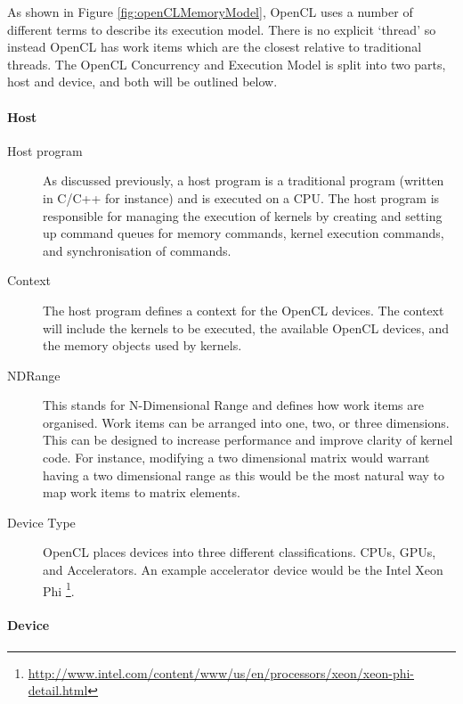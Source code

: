 As shown in Figure \ref{fig:openCLMemoryModel}, OpenCL uses a number of
different terms to describe its execution model. There is no explicit `thread'
so instead OpenCL has work items which are the closest relative to traditional
threads. The OpenCL Concurrency and Execution Model is split into two parts,
host and device, and both will be outlined below.

\paragraph{Host}

\begin{description}

\item[Host program] As discussed previously, a host program is a traditional
program (written in C/C++ for instance) and is executed on a CPU. The host
program is responsible for managing the execution of kernels by creating and
setting up command queues for memory commands, kernel execution commands, and
synchronisation of commands.

\item[Context] The host program defines a context for the OpenCL devices. The
context will include the kernels to be executed, the available OpenCL devices,
and the memory objects used by kernels.

\item[NDRange] This stands for N-Dimensional Range and defines how work items
are organised. Work items can be arranged into one, two, or three dimensions.
This can be designed to increase performance and improve clarity of kernel code.
For instance, modifying a two dimensional matrix would warrant having a two
dimensional range as this would be the most natural way to map work items to
matrix elements.

\item[Device Type] OpenCL places devices into three different classifications.
CPUs, GPUs, and Accelerators. An example accelerator device would be the Intel
Xeon Phi
\footnote{\url{http://www.intel.com/content/www/us/en/processors/xeon/xeon-phi-detail.html}}.

\end{description}

\paragraph{Device}

